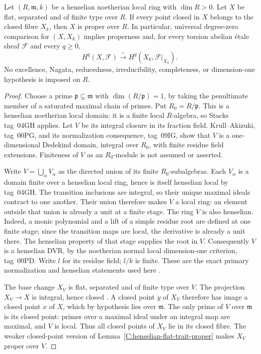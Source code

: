 \begin{theorem}\label{B:henselian-local-flat-proper}
Let $(R,\mathfrak m,k)$ be a henselian noetherian local ring with
$\dim R>0$. Let $X$ be flat, separated and of finite type over $R$.
If every point closed in $X$ belongs to the closed fibre $X_k$,
then $X$ is proper over $R$. In particular, universal degree-zero
comparison for $(X,X_k)$ implies properness and, for every torsion
abelian \'etale sheaf $\mathcal F$ and every $q\geq0$,
\[
 H^q(X,\mathcal F)\xrightarrow{\sim}
 H^q(X_k,\mathcal F|_{X_k}).
\]
No excellence, Nagata, reducedness, irreducibility, completeness,
or dimension-one hypothesis is imposed on $R$.
\end{theorem}
\begin{proof}
Choose a prime $\mathfrak p\subsetneq\mathfrak m$ with
$\dim(R/\mathfrak p)=1$, by taking the penultimate member of a
saturated maximal chain of primes. Put $R_0=R/\mathfrak p$.
This is a henselian noetherian local domain: it is a finite local
$R$-algebra, so Stacks tag~04GH applies. Let $V$ be its integral
closure in its fraction field. Krull--Akizuki, tag~00PG, and its
normalization consequence, tag~09IG, show that $V$ is a
one-dimensional Dedekind domain, integral over $R_0$, with finite
residue field extensions. Finiteness of $V$ as an $R_0$-module
is not assumed or asserted.

Write $V=\bigcup_\alpha V_\alpha$ as the directed union of its
finite $R_0$-subalgebras. Each $V_\alpha$ is a domain finite over
a henselian local ring, hence is itself henselian local by
tag~04GH. The transition inclusions are integral, so their unique
maximal ideals contract to one another. Their union therefore
makes $V$ a local ring: an element outside that union is already
a unit at a finite stage. The ring $V$ is also henselian.
Indeed, a monic polynomial and a lift of a simple residue root
are defined at one finite stage; since the transition maps are
local, the derivative is already a unit there. The henselian
property of that stage supplies the root in $V$. Consequently
$V$ is a henselian DVR, by the noetherian normal local
dimension-one criterion, tag~00PD. Write $l$ for its residue
field; $l/k$ is finite. These are the exact primary normalization
and henselian statements used here \cite[Tags 00PG, 09IG, 04GH,
00PD]{BStacks}.

The base change $X_V$ is flat, separated and of finite type over
$V$. The projection $X_V\to X$ is integral, hence closed
\cite[Lemmas 29.45.6--7]{BStacks}. A closed point $y$ of $X_V$
therefore has image a closed point $x$ of $X$, which by hypothesis
lies over $\mathfrak m$. The only prime of $V$ over
$\mathfrak m$ is its closed point: primes over a maximal ideal
under an integral map are maximal, and $V$ is local. Thus all
closed points of $X_V$ lie in its closed fibre. The weaker
closed-point version of Lemma~\ref{C:henselian-flat-trait-proper}
makes $X_V$ proper over $V$.


\end{proof}
